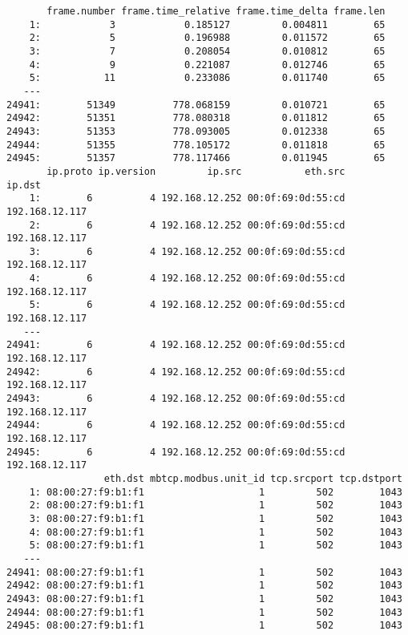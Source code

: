 \documentclass[12pt,]{article}
\begin{document}
\begin{verbatim}
       frame.number frame.time_relative frame.time_delta frame.len
    1:            3            0.185127         0.004811        65
    2:            5            0.196988         0.011572        65
    3:            7            0.208054         0.010812        65
    4:            9            0.221087         0.012746        65
    5:           11            0.233086         0.011740        65
   ---                                                            
24941:        51349          778.068159         0.010721        65
24942:        51351          778.080318         0.011812        65
24943:        51353          778.093005         0.012338        65
24944:        51355          778.105172         0.011818        65
24945:        51357          778.117466         0.011945        65
       ip.proto ip.version         ip.src           eth.src         ip.dst
    1:        6          4 192.168.12.252 00:0f:69:0d:55:cd 192.168.12.117
    2:        6          4 192.168.12.252 00:0f:69:0d:55:cd 192.168.12.117
    3:        6          4 192.168.12.252 00:0f:69:0d:55:cd 192.168.12.117
    4:        6          4 192.168.12.252 00:0f:69:0d:55:cd 192.168.12.117
    5:        6          4 192.168.12.252 00:0f:69:0d:55:cd 192.168.12.117
   ---                                                                    
24941:        6          4 192.168.12.252 00:0f:69:0d:55:cd 192.168.12.117
24942:        6          4 192.168.12.252 00:0f:69:0d:55:cd 192.168.12.117
24943:        6          4 192.168.12.252 00:0f:69:0d:55:cd 192.168.12.117
24944:        6          4 192.168.12.252 00:0f:69:0d:55:cd 192.168.12.117
24945:        6          4 192.168.12.252 00:0f:69:0d:55:cd 192.168.12.117
                 eth.dst mbtcp.modbus.unit_id tcp.srcport tcp.dstport
    1: 08:00:27:f9:b1:f1                    1         502        1043
    2: 08:00:27:f9:b1:f1                    1         502        1043
    3: 08:00:27:f9:b1:f1                    1         502        1043
    4: 08:00:27:f9:b1:f1                    1         502        1043
    5: 08:00:27:f9:b1:f1                    1         502        1043
   ---                                                               
24941: 08:00:27:f9:b1:f1                    1         502        1043
24942: 08:00:27:f9:b1:f1                    1         502        1043
24943: 08:00:27:f9:b1:f1                    1         502        1043
24944: 08:00:27:f9:b1:f1                    1         502        1043
24945: 08:00:27:f9:b1:f1                    1         502        1043

\end{verbatim}
\end{document}
